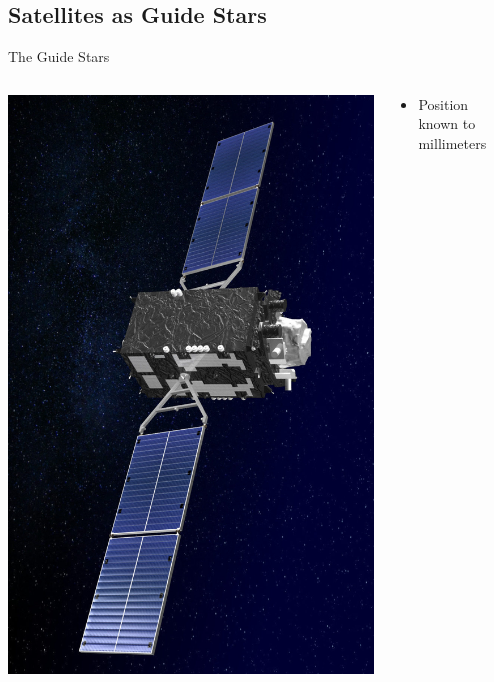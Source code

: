 \documentclass[ignorenonframetext]{beamer}
\begin{document}
\subsection{Satellites as Guide Stars}

\begin{frame}{The Guide Stars}
 \begin{columns}
  \begin{column}{0.5\linewidth}
   \includegraphics[height=0.9\textheight]{fig/QZS-1.jpg}
  \end{column}
  \begin{column}{0.5\linewidth}
  \begin{itemize}
   \item Position known to millimeters

\end{itemize}
\end{column}
\end{columns}
\end{frame}
\end{document}
